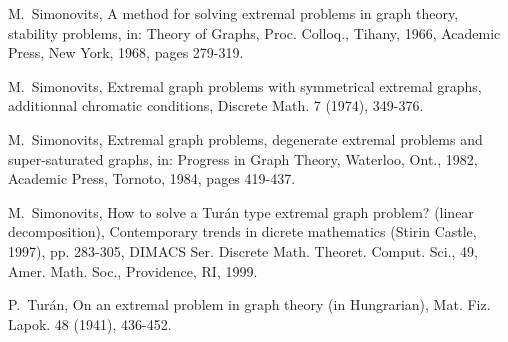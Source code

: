 \documentclass[10pt]{article}
\begin{document}
\begin{thebibliography}{1}
 M.~Simonovits, A method for solving extremal problems in graph theory, stability problems, in: Theory of Graphs, Proc. Colloq., Tihany, 1966, Academic Press, New York, 1968, pages 279-319.

 M.~Simonovits, Extremal graph problems with symmetrical extremal graphs, additionnal chromatic conditions, Discrete Math. 7 (1974), 349-376.

 M.~Simonovits, Extremal graph problems, degenerate extremal problems and super-saturated graphs, in: Progress in Graph Theory, Waterloo, Ont., 1982, Academic Press, Tornoto, 1984, pages 419-437.

 M.~Simonovits, How to solve a Tur\'{a}n type extremal graph problem? (linear decomposition), Contemporary trends in dicrete mathematics (Stirin Castle, 1997), pp. 283-305, DIMACS Ser. Discrete Math. Theoret. Comput. Sci., 49, Amer. Math. Soc., Providence, RI, 1999.

 P.~Tur\'{a}n, On an extremal problem in graph theory (in Hungrarian), Mat. Fiz. Lapok. 48 (1941), 436-452.
\end{thebibliography}
\end{document}
